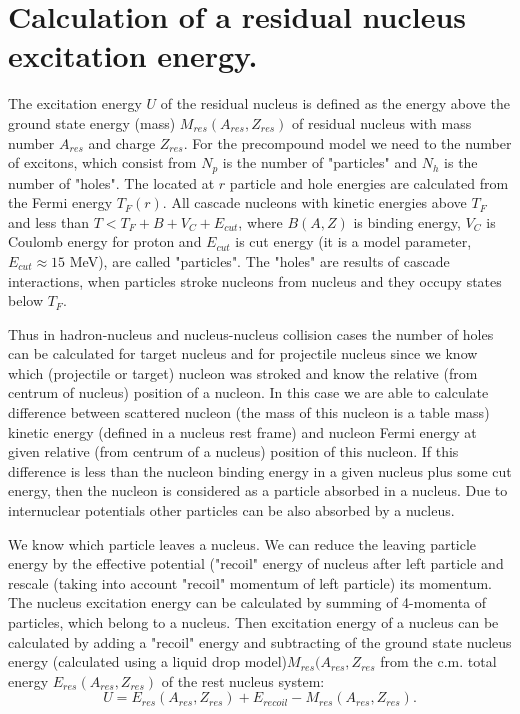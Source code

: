 \section{Calculation of a residual nucleus excitation energy.}

\hspace{1.0em}The excitation energy $U$ of the residual nucleus is
defined as the energy above the ground state energy (mass)
$M_{res}(A_{res},Z_{res})$ of residual nucleus with mass number
$A_{res}$ and charge $Z_{res}$.
For the precompound model we need to the number of excitons, which 
consist from 
$N_p$ is the number of "particles" and $N_{h}$ is the number of
"holes".  The located at $r$ particle and hole energies are 
calculated from the Fermi
energy $T_F(r)$.
All cascade nucleons with kinetic energies above $T_{F}$ and less than
$T<T_F+B+V_C+E_{cut}$, where $B(A,Z)$ is binding energy, $V_C$ is
Coulomb energy for proton and $E_{cut}$ is cut energy (it is a model
parameter, $E_{cut}\approx 15$ MeV), are called "particles". The "holes"
are results of cascade interactions, when particles stroke nucleons from
nucleus and they occupy states below $T_{F}$.


Thus in hadron-nucleus and nucleus-nucleus collision cases the number
 of holes can be calculated for 
 target nucleus and for projectile nucleus since we know which (projectile or 
target) nucleon was stroked and 
know the relative (from centrum of nucleus) position of a nucleon. In 
this case we are able to calculate difference between scattered 
nucleon (the mass of 
this nucleon is a table mass) kinetic energy (defined in a nucleus rest 
frame) and nucleon Fermi energy at given 
relative (from centrum of a nucleus) position of this nucleon. If this 
difference is less than the nucleon binding energy in a given nucleus plus 
some cut energy, then the nucleon is considered as a particle 
absorbed in a nucleus. Due to internuclear potentials other 
particles can be also absorbed by a nucleus.

We know which particle leaves a nucleus. We can reduce the leaving 
particle energy by the effective potential ("recoil" energy of nucleus after 
left particle \cite{FRRS96} 
  and rescale (taking into account "recoil" momentum of left particle)
   its momentum.
The nucleus excitation energy 
can be calculated by summing of 4-momenta of 
particles, which belong to a nucleus. Then excitation energy of 
a nucleus can be calculated by adding a "recoil" energy and 
subtracting of the ground state nucleus energy 
(calculated using a liquid drop model)$M_{res}(A_{res},Z_{res}$ 
from the c.m. total energy $E_{res}(A_{res},Z_{res})$ of the 
rest nucleus system:
\begin{equation}
\label{EEC1}U=E_{res}(A_{res},Z_{res})+ E_{recoil} -M_{res}(A_{res},Z_{res}).
\end{equation}

